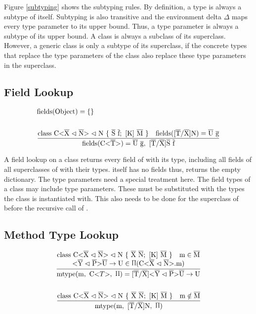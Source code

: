 Figure \ref{subtyping} shows the subtyping rules. By definition, a type is always a subtype of itself. Subtyping is also transitive and the environment delta $\Delta$ maps every type parameter to its upper bound. Thus, a type parameter is always a subtype of its upper bound.
A class is always a subclass of its superclass. However, a generic class is only a subtype of its superclass, if the concrete types that replace the type parameters of the class also replace these type parameters in the superclass.

\subsection{Field Lookup}

\begin{align*}
    &\text{fields}(\text{Object}) = \{\}\\
    \\
    &\frac{\class{S}{f} \quad \text{fields}(\tsxsn{T}{X}{N}) = \ot{U} \ \ot{g} }{\text{fields}(\nvt{C}{T}) = \ot{U} \ \ot{g}, \ \tsxsns{T}{X}{S} \ \ot{f}}\\
\end{align*}

A field lookup on a class  returns every field of  with its type, including all fields of all superclasses of  with their types.  itself has no fields thus,  returns the empty dictionary.
The type parameters need a special treatment here. The field types of a class  may include type parameters. These must be substituted with the types the class is instantiated with. This also needs to be done for the superclass of  before the recursive call of .

\subsection{Method Type Lookup}

\begin{align*}
    \frac{
        \begin{matrix}
            \class{X}{N} \quad \text{m} \in \ot{M} \\
            \yp \oto{\text{U}} \in \sprod{.7} (\cm)
        \end{matrix}
    }{\mtypeC{\nvtt{C}{T}} = \tsxsn{T}{X}{} \yp \oto{\text{U}}}
    \\
    \\
    \frac{\class{X}{N} \quad \text{m} \notin \ot{M}}{\mtypeC{\tsxsn{T}{X}{N}}}
\end{align*}


